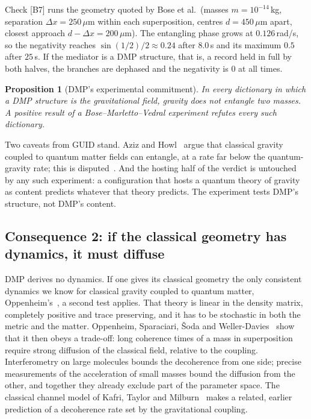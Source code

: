 \documentclass[11pt,a4paper]{article}
\newtheorem{proposition}{Proposition}
\theoremstyle{definition}
\theoremstyle{remark}
\newcommand{\chk}[1]{\textsf{[#1]}}
\begin{document}
Check \chk{B7} runs the geometry quoted by Bose et al.\ (masses $m=10^{-14}$\,kg, separation $\Delta x=250\,\mu$m within each superposition,
centres $d=450\,\mu$m apart, closest approach $d-\Delta x=200\,\mu$m). The entangling phase grows at $0.126$\,rad/s, so the negativity
reaches $\sin(1/2)/2\approx0.24$ after $8.0$\,s and its maximum $0.5$ after $25$\,s. If the mediator is a DMP structure, that is, a record
held in full by both halves, the branches are dephased and the negativity is $0$ at all times.

\begin{proposition}[DMP's experimental commitment]\label{pr:bmv}
In every dictionary in which a DMP structure is the gravitational field, gravity does not entangle two masses. A positive result of a
Bose--Marletto--Vedral experiment refutes every such dictionary.
\end{proposition}

\noindent Two caveats from GUID stand. Aziz and Howl~\cite{azizhowl} argue that classical gravity coupled to quantum matter fields can
entangle, at a rate far below the quantum-gravity rate; this is disputed~\cite{movw,diosi,shl}. And the hosting half of the verdict is
untouched by any such experiment: a configuration that hosts a quantum theory of gravity as content predicts whatever that theory predicts.
The experiment tests DMP's structure, not DMP's content.

\subsection{Consequence 2: if the classical geometry has dynamics, it must diffuse}\label{sec:oppenheim}

DMP derives no dynamics. If one gives its classical geometry the only consistent dynamics we know for classical gravity coupled to quantum
matter, Oppenheim's~\cite{oppenheim}, a second test applies. That theory is linear in the density matrix, completely positive and trace
preserving, and it has to be stochastic in both the metric and the matter. Oppenheim, Sparaciari, \v{S}oda and Weller-Davies~\cite{osswd}
show that it then obeys a trade-off: long coherence times of a mass in superposition require strong diffusion of the classical field,
relative to the coupling. Interferometry on large molecules bounds the decoherence from one side; precise measurements of the
acceleration of small masses bound the diffusion from the other, and together they already exclude part of the parameter space. The
classical channel model of Kafri, Taylor and Milburn~\cite{ktm} makes a related, earlier prediction of a decoherence rate set by the
gravitational coupling.
\end{document}

